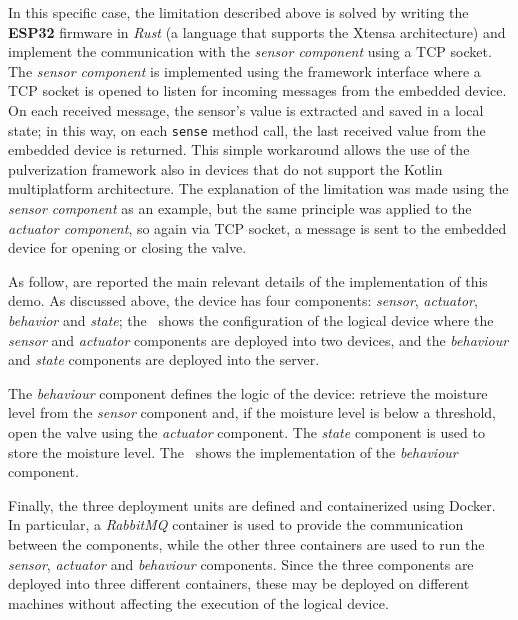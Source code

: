 In this specific case, the limitation described above is solved by writing the \textbf{ESP32} firmware in \emph{Rust} (a language that supports the
Xtensa architecture) and implement the communication with the \emph{sensor component} using a TCP socket. The \emph{sensor component} is
implemented using the framework interface where a TCP socket is opened to listen for incoming messages from the embedded device.
On each received message, the sensor's value is extracted and saved in a local state; in this way, on each \texttt{sense} method call,
the last received value from the embedded device is returned.
This simple workaround allows the use of the pulverization framework also in devices that do not support the Kotlin multiplatform architecture.
The explanation of the limitation was made using the \emph{sensor component} as an example, but the same principle was applied to the
\emph{actuator component}, so again via TCP socket, a message is sent to the embedded device for opening or closing the valve.

As follow, are reported the main relevant details of the implementation of this demo.
As discussed above, the device has four components: \emph{sensor}, \emph{actuator}, \emph{behavior} and \emph{state};
the~ shows the configuration of the logical device where the \emph{sensor} and \emph{actuator} components are
deployed into two devices, and the \emph{behaviour} and \emph{state} components are deployed into the server.



The \emph{behaviour} component defines the logic of the device: retrieve the moisture level from the \emph{sensor} component and, if the moisture level is below a threshold, open the valve using the \emph{actuator} component. The \emph{state} component is used to store the moisture level.
The~ shows the implementation of the \emph{behaviour} component.



Finally, the three deployment units are defined and containerized using Docker. In particular, a \emph{RabbitMQ} container is used to provide the
communication between the components, while the other three containers are used to run the \emph{sensor}, \emph{actuator} and \emph{behaviour}
components. Since the three components are deployed into three different containers, these may be deployed on different machines without affecting
the execution of the logical device.

